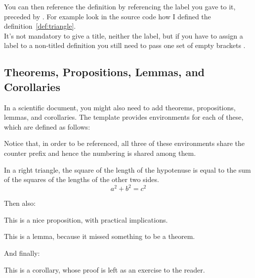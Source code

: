 \documentclass[../main.tex]{subfiles}
\begin{document}
You can then reference the definition by referencing the label you gave to it,
preceded by . For example look in the source code how I defined the
definition~\ref{def:triangle}.\\
It's not mandatory to give a title, neither the label, but if you have to assign a label to a non-titled definition you still need to pass one set of empty brackets .

\pagebreak
\subsection{Theorems, Propositions, Lemmas, and Corollaries}

In a scientific document, you might also need to add theorems, propositions, lemmas, and corollaries. The template provides environments for each of these, which are defined as follows:

\begin{center}
\end{center}

Notice that, in order to be referenced, all three of these environments share
the counter prefix  and hence the numbering is shared among them.\\

\begin{theorem}
    In a right triangle, the square of the length of the hypotenuse is equal to the sum of the squares of the lengths of the other two sides.
    \begin{equation*}
        a^2 + b^2 = c^2
    \end{equation*}
\end{theorem}

Then also:

\begin{proposition}
	This is a nice proposition, with practical implications.
\end{proposition}

\begin{lemma}
	This is a lemma, because it missed something to be a theorem.
\end{lemma}

And finally:

\begin{corollary}
	This is a corollary, whose proof is left as an exercise to the reader.
\end{corollary}
\end{document}
